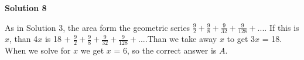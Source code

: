 \begin{enumerate}
 



\textbf{Solution 8}

As in Solution 3, the area form the geometric series $\frac{9}{2} + \frac{9}{8} + \frac{9}{32} + \frac{9}{128} + ...$. If this is $x$, than 4$x$ is 18 + $\frac{9}{2} + \frac{9}{8} + \frac{9}{32} + \frac{9}{128} + ...$.Than we take away $x$ to get 3$x$ = 18. When we solve for $x$ we get $x$ = 6, so the correct answer is $\boxed{A}$.

 


 


\end{enumerate}